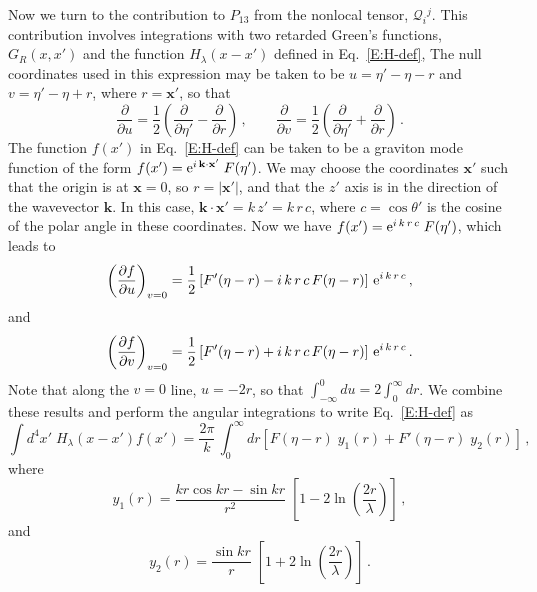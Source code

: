 \documentclass[preprint,prd,showpacs,superscriptaddress]{revtex4}
\begin{document}
Now we turn to the contribution to $P_{13}$ from the nonlocal tensor, $\mathcal{Q}_{i}{}^{j}$. This contribution
involves integrations with two retarded Green's functions, $G_{R}(x,x')$ and the function  $H_{\lambda}(x-x')$
defined in Eq.~\eqref{E:H-def}, The null coordinates used in this expression may be taken to be $u=\eta'-\eta -r$
and $v=\eta'-\eta +r$, where $r= \mathbf{x'}$, so that
\begin{equation}
\frac{\partial}{\partial u} = \frac{1}{2}\left(\frac{\partial}{\partial\eta'}-\frac{\partial}{\partial r}\right) \,, \qquad
\frac{\partial}{\partial v} =\frac{1}{2}\left(\frac{\partial}{\partial\eta'}+\frac{\partial}{\partial r}\right)\,.
\end{equation}
The function $f(x')$ in Eq.~\eqref{E:H-def} can be taken to be a graviton mode function of the form 
$f(x') = {\rm e}^{i\,\mathbf{k}\cdot\mathbf{x'}}\; F(\eta')$. We may choose the coordinates $\mathbf{x'}$ such
that the origin is at $\mathbf{x}=0$, so $r = |\mathbf{x'}|$, and  that the $z'$ axis is in the direction of
the wavevector $\mathbf{k}$. In this case, $\mathbf{k}\cdot\mathbf{x'} = k\, z' = k\,r \, c$, where $c = \cos \theta'$
is the cosine of the polar angle in these coordinates. Now we have $f(x') = {\rm e}^{i\, k \,r \,c}\; F(\eta')$, which 
leads to
\begin{equation}
\left(\frac{\partial f}{\partial u}\right)_{v=0} = \frac{1}{2}\left[ F'(\eta-r) - i\, k \,r \,c\, F(\eta-r)\right]\, {\rm e}^{i\, k \,r \,c} \,,
\end{equation}
and 
\begin{equation}
\left(\frac{\partial f}{\partial v}\right)_{v=0} = \frac{1}{2}\left[ F'(\eta-r) + i\, k \,r \,c\, F(\eta-r)\right]\,  {\rm e}^{i\, k \,r \,c} \,.
\end{equation}
Note that along the $v=0$ line, $u=-2 r$, so that $\int_{-\infty}^{0}\!du = 2 \int^{\infty}_{0}\!dr$. 
We combine these results and perform the angular integrations to write Eq.~\eqref{E:H-def} as
\begin{equation}\label{E:H-F}
	\int\!d^{4}x'\;H_{\lambda}(x-x')f(x')= \frac{2\pi}{k}\,  \int^{\infty}_{0}\!dr \left[ F(\eta-r)\; y_1(r) +  F'(\eta-r)\; y_2(r)\right]\,,
\end{equation}
where
\begin{equation}
y_1(r) = \frac{k r \cos kr - \sin kr}{r^2}\; \left[1 -2 \ln\left(\frac{2 r}{\lambda} \right)\right]\,,
\end{equation}
and
\begin{equation}
y_2(r) = \frac{\sin kr}{r}\; \left[1 +2 \ln\left(\frac{2 r}{\lambda} \right)\right]\,.
\end{equation}
\end{document}

